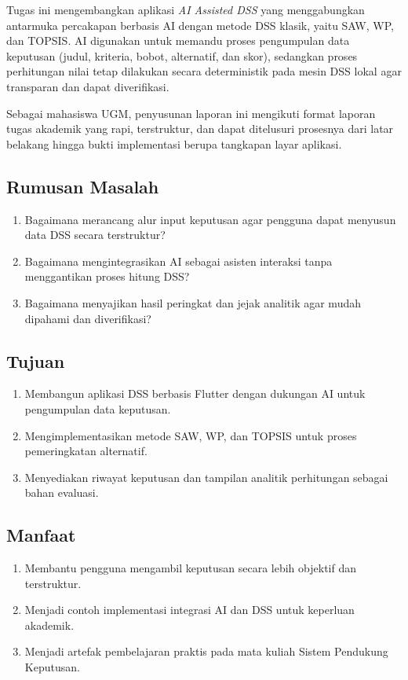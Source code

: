 \documentclass[12pt,a4paper]{article}
\begin{document}
Tugas ini mengembangkan aplikasi \textit{AI Assisted DSS} yang menggabungkan antarmuka percakapan berbasis AI dengan metode DSS klasik, yaitu SAW, WP, dan TOPSIS. AI digunakan untuk memandu proses pengumpulan data keputusan (judul, kriteria, bobot, alternatif, dan skor), sedangkan proses perhitungan nilai tetap dilakukan secara deterministik pada mesin DSS lokal agar transparan dan dapat diverifikasi.

Sebagai mahasiswa UGM, penyusunan laporan ini mengikuti format laporan tugas akademik yang rapi, terstruktur, dan dapat ditelusuri prosesnya dari latar belakang hingga bukti implementasi berupa tangkapan layar aplikasi.

\subsection{Rumusan Masalah}
\begin{enumerate}
  \item Bagaimana merancang alur input keputusan agar pengguna dapat menyusun data DSS secara terstruktur?
  \item Bagaimana mengintegrasikan AI sebagai asisten interaksi tanpa menggantikan proses hitung DSS?
  \item Bagaimana menyajikan hasil peringkat dan jejak analitik agar mudah dipahami dan diverifikasi?
\end{enumerate}

\subsection{Tujuan}
\begin{enumerate}
  \item Membangun aplikasi DSS berbasis Flutter dengan dukungan AI untuk pengumpulan data keputusan.
  \item Mengimplementasikan metode SAW, WP, dan TOPSIS untuk proses pemeringkatan alternatif.
  \item Menyediakan riwayat keputusan dan tampilan analitik perhitungan sebagai bahan evaluasi.
\end{enumerate}

\subsection{Manfaat}
\begin{enumerate}
  \item Membantu pengguna mengambil keputusan secara lebih objektif dan terstruktur.
  \item Menjadi contoh implementasi integrasi AI dan DSS untuk keperluan akademik.
  \item Menjadi artefak pembelajaran praktis pada mata kuliah Sistem Pendukung Keputusan.
\end{enumerate}
\end{document}
